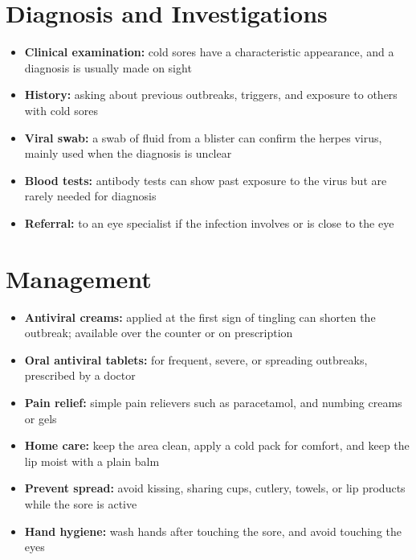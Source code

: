 \section*{Diagnosis and Investigations}
\begin{itemize}
    \item \textbf{Clinical examination:} cold sores have a characteristic appearance, and a diagnosis is usually made on sight
    \item \textbf{History:} asking about previous outbreaks, triggers, and exposure to others with cold sores
    \item \textbf{Viral swab:} a swab of fluid from a blister can confirm the herpes virus, mainly used when the diagnosis is unclear
    \item \textbf{Blood tests:} antibody tests can show past exposure to the virus but are rarely needed for diagnosis
    \item \textbf{Referral:} to an eye specialist if the infection involves or is close to the eye
\end{itemize}

\section*{Management}
\begin{itemize}
    \item \textbf{Antiviral creams:} applied at the first sign of tingling can shorten the outbreak; available over the counter or on prescription
    \item \textbf{Oral antiviral tablets:} for frequent, severe, or spreading outbreaks, prescribed by a doctor
    \item \textbf{Pain relief:} simple pain relievers such as paracetamol, and numbing creams or gels
    \item \textbf{Home care:} keep the area clean, apply a cold pack for comfort, and keep the lip moist with a plain balm
    \item \textbf{Prevent spread:} avoid kissing, sharing cups, cutlery, towels, or lip products while the sore is active
    \item \textbf{Hand hygiene:} wash hands after touching the sore, and avoid touching the eyes
\end{itemize}

